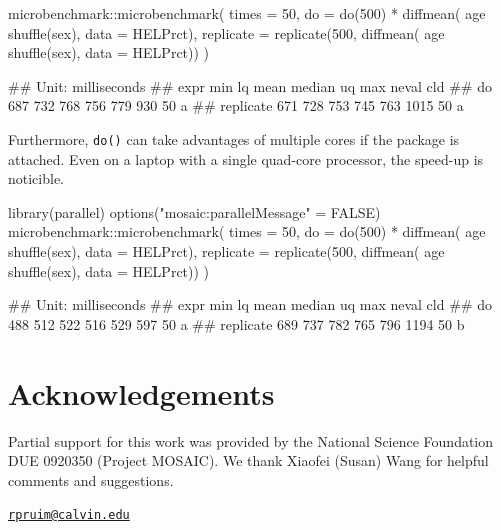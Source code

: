 \begin{Schunk}
\begin{Sinput}
microbenchmark::microbenchmark( times = 50,
  do = do(500) * diffmean( age ~ shuffle(sex), data = HELPrct),
  replicate = replicate(500, diffmean( age ~ shuffle(sex), data = HELPrct))
)
\end{Sinput}
\begin{Soutput}
## Unit: milliseconds
##       expr min  lq mean median  uq  max neval cld
##         do 687 732  768    756 779  930    50   a
##  replicate 671 728  753    745 763 1015    50   a
\end{Soutput}
\end{Schunk}

\noindent
Furthermore, \texttt{do()} can take advantages of multiple cores if the
 package is attached. Even on a laptop with a single
quad-core processor, the speed-up is noticible.

\begin{Schunk}
\begin{Sinput}
library(parallel)
options("mosaic:parallelMessage" = FALSE)
microbenchmark::microbenchmark( times = 50,
  do = do(500) * diffmean( age ~ shuffle(sex), data = HELPrct),
  replicate = replicate(500, diffmean( age ~ shuffle(sex), data = HELPrct))
)
\end{Sinput}
\begin{Soutput}
## Unit: milliseconds
##       expr min  lq mean median  uq  max neval cld
##         do 488 512  522    516 529  597    50  a 
##  replicate 689 737  782    765 796 1194    50   b
\end{Soutput}
\end{Schunk}

\section{Acknowledgements}\label{acknowledgements}

Partial support for this work was provided by the National Science
Foundation DUE 0920350 (Project MOSAIC). We thank Xiaofei (Susan) Wang
for helpful comments and suggestions.



\address{%
Randall Pruim\\
Calvin College\\
Department of Mathematics and Statistics\\ 3201 Burton St SE\\ Grand Rapids, MI 49546\\
}
\href{mailto:rpruim@calvin.edu}{\nolinkurl{rpruim@calvin.edu}}

